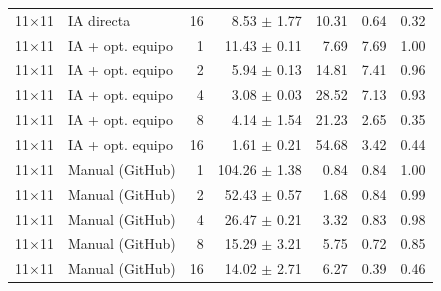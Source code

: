 \begin{tabular}{llrrrrr}
11$\times$11 & IA directa & 16 & 8.53 $\pm$ 1.77 & 10.31 & 0.64 & 0.32 \\
11$\times$11 & IA + opt. equipo & 1 & 11.43 $\pm$ 0.11 & 7.69 & 7.69 & 1.00 \\
11$\times$11 & IA + opt. equipo & 2 & 5.94 $\pm$ 0.13 & 14.81 & 7.41 & 0.96 \\
11$\times$11 & IA + opt. equipo & 4 & 3.08 $\pm$ 0.03 & 28.52 & 7.13 & 0.93 \\
11$\times$11 & IA + opt. equipo & 8 & 4.14 $\pm$ 1.54 & 21.23 & 2.65 & 0.35 \\
11$\times$11 & IA + opt. equipo & 16 & 1.61 $\pm$ 0.21 & 54.68 & 3.42 & 0.44 \\
11$\times$11 & Manual (GitHub) & 1 & 104.26 $\pm$ 1.38 & 0.84 & 0.84 & 1.00 \\
11$\times$11 & Manual (GitHub) & 2 & 52.43 $\pm$ 0.57 & 1.68 & 0.84 & 0.99 \\
11$\times$11 & Manual (GitHub) & 4 & 26.47 $\pm$ 0.21 & 3.32 & 0.83 & 0.98 \\
11$\times$11 & Manual (GitHub) & 8 & 15.29 $\pm$ 3.21 & 5.75 & 0.72 & 0.85 \\
11$\times$11 & Manual (GitHub) & 16 & 14.02 $\pm$ 2.71 & 6.27 & 0.39 & 0.46 \\
\bottomrule
\end{tabular}
